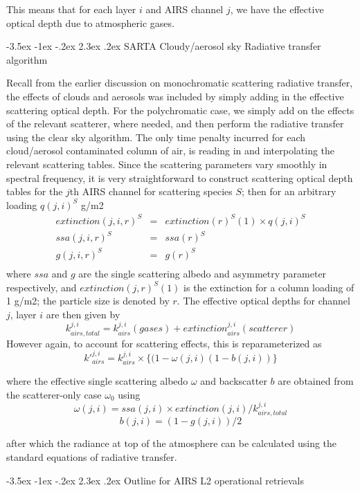 \documentclass[11pt]{article}
\makeatletter
\renewcommand{\section}{\@startsection {section}{1}{\z@}%
                                   {-3.5ex \@plus -1ex \@minus -.2ex}%
                                   {2.3ex \@plus.2ex}%
                                   {\reset@font\large\bfseries}}
\makeatother
\begin{document}
This means that for each layer $i$ and AIRS channel $j$, we have the effective optical depth due to atmospheric gases. 

\section{SARTA Cloudy/aerosol sky Radiative transfer algorithm}

Recall from the earlier discussion on monochromatic scattering radiative transfer, the effects of clouds and 
aerosols was included by simply 
adding in the effective scattering optical depth. For the polychromatic case, we simply add on the effects of the 
relevant scatterer, where needed, and then perform the radiative transfer using the clear sky algorithm. The only time 
penalty incurred for each cloud/aerosol contaminated column of air, is reading in and interpolating the relevant 
scattering tables. Since the scattering parameters vary smoothly in spectral frequency, it is very straightforward to 
construct scattering optical depth tables for the $j$th AIRS channel for scattering species $S$; then for an arbitrary 
loading $q(j,i)^{S}$ g/m2
 \begin{eqnarray*}
  extinction(j,i,r)^{S} & = &  extinction(r)^{S}(1) \times  q(j,i)^{S} \\
  ssa(j,i,r)^{S} & = &  ssa(r)^{S} \\
  g(j,i,r)^{S} & = &  g(r)^{S} \\
\end{eqnarray*}
where $ssa$ and $g$ are the single scattering albedo and asymmetry parameter respectively, and $extinction(j,r)^{S}(1)$ 
is the extinction for a column loading of 1 g/m2; the particle size is denoted by $r$. The effective optical depths for 
channel $j$, layer $i$ are then given by
\[
   k_{airs,total}^{j,i} = k_{airs}^{j,i}(gases) + extinction_{airs}^{j,i}(scatterer)
\]
However again, to account for scattering effects, this is reparameterized as
\[
k\prime_{airs}^{j,i} = k_{airs}^{j,i} \times \{ (1-\omega(j,i) (1-b(j,i)) \}
\]

where the effective single scattering albedo $\omega$ and backscatter $b$ are
obtained from the scatterer-only case $\omega_{0}$ using
\[
\omega(j,i) = ssa(j,i) \times extinction(j,i)/k_{airs,total}^{j,i}
\]
\[
b(j,i)      = (1 - g(j,i))/2
\]

after which the radiance at top of the atmosphere can be calculated using the standard equations of radiative transfer.

\section{Outline for AIRS L2 operational retrievals}
\end{document}
